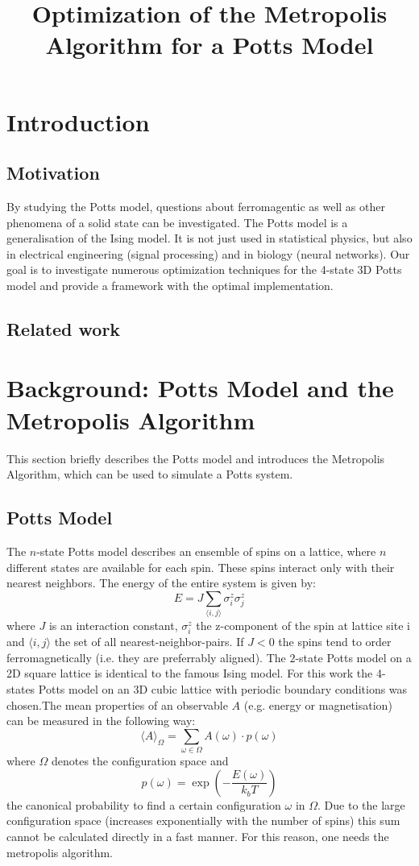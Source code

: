 \documentclass[letterpaper]{article}
\title{Optimization of the Metropolis Algorithm for a Potts Model}
\begin{document}
%
\maketitle
%


\begin{abstract}
\end{abstract}

\section{Introduction}\label{sec:intro}
\subsection{Motivation} 
By studying the Potts model, questions about ferromagentic as well as other phenomena of a solid state can be investigated. The Potts model is a generalisation of the Ising model. It is not just used in statistical physics, but also in electrical engineering (signal processing) and in biology (neural networks). Our goal is to investigate numerous optimization techniques for the 4-state 3D Potts model and provide a framework with the optimal implementation. 
\subsection{Related work}
\section{Background: Potts Model and the Metropolis Algorithm}\label{sec:background}
This section briefly describes the Potts model and introduces the Metropolis Algorithm, which can be used to simulate a Potts system.
\subsection{Potts Model}
The $n$-state Potts model describes an ensemble of spins on a lattice, where $n$ different
states are available for each spin. These spins interact only with
their nearest neighbors. The energy of the entire system is given
by:
\[
E=J\sum_{\langle i,j \rangle}\sigma_{i}^{z}\sigma_{j}^{z}
\]
where $J$ is an interaction constant, $\sigma_{i}^{z}$ the z-component of the
spin at lattice site i and $\langle i,j \rangle$ the set of all nearest-neighbor-pairs.
If $J<0$ the spins tend to order ferromagnetically (i.e. they are preferrably aligned). The $2$-state Potts model on a 2D square lattice is identical to the famous Ising
model. For this work the 4-states Potts model on an 3D cubic lattice
with periodic boundary conditions was chosen.\newline The mean properties of an observable $A$
(e.g. energy or magnetisation) can be measured in the following way:
\[
\langle A\rangle_\Omega=\sum_{\omega\in\Omega}A(\omega)\cdot p(\omega)
\]
where $\Omega$ denotes the configuration space and \[p(\omega)=\exp{\left(-\frac{E(\omega)}{k_{b}T}\right)}\]
the canonical probability to find a certain configuration $\omega$
in $\Omega$. 
Due to the large configuration space (increases exponentially with
the number of spins) this sum cannot be calculated directly in a fast
manner. For this reason, one needs the metropolis algorithm.
\end{document}
